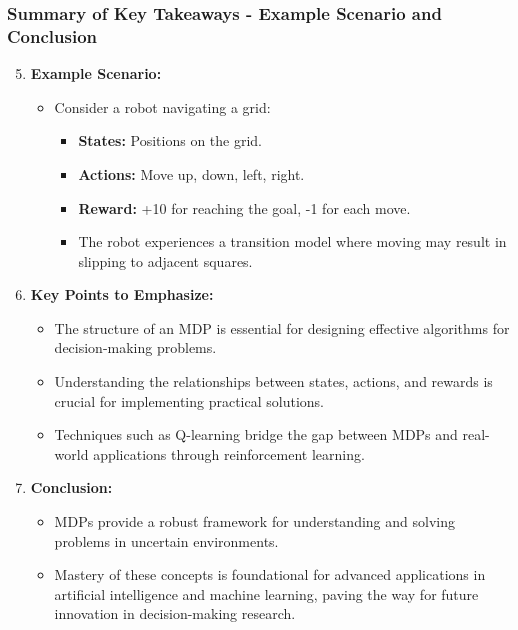 \documentclass[aspectratio=169]{beamer}
\begin{document}
\begin{frame}[fragile]
    \frametitle{Summary of Key Takeaways - Example Scenario and Conclusion}
    \begin{enumerate}
        \setcounter{enumi}{4}
        \item \textbf{Example Scenario:}
        \begin{itemize}
            \item Consider a robot navigating a grid:
            \begin{itemize}
                \item \textbf{States:} Positions on the grid.
                \item \textbf{Actions:} Move up, down, left, right.
                \item \textbf{Reward:} +10 for reaching the goal, -1 for each move.
                \item The robot experiences a transition model where moving may result in slipping to adjacent squares.
            \end{itemize}
        \end{itemize}

        \item \textbf{Key Points to Emphasize:}
        \begin{itemize}
            \item The structure of an MDP is essential for designing effective algorithms for decision-making problems.
            \item Understanding the relationships between states, actions, and rewards is crucial for implementing practical solutions.
            \item Techniques such as Q-learning bridge the gap between MDPs and real-world applications through reinforcement learning.
        \end{itemize}

        \item \textbf{Conclusion:}
        \begin{itemize}
            \item MDPs provide a robust framework for understanding and solving problems in uncertain environments.
            \item Mastery of these concepts is foundational for advanced applications in artificial intelligence and machine learning, paving the way for future innovation in decision-making research.
        \end{itemize}
    \end{enumerate}
\end{frame}
\end{document}
